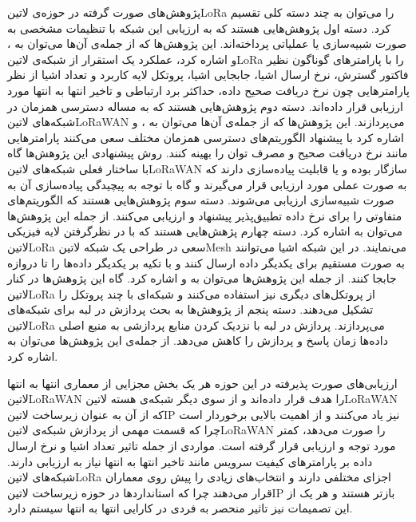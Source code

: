 پژوهش‌های صورت گرفته در حوزه‌ی ‌لاتین{LoRa} را می‌توان به چند دسته کلی تقسیم کرد. دسته اول پژوهش‌هایی هستند که به ارزیابی این شبکه با تنظیمات مشخصی
به صورت شبیه‌سازی یا عملیاتی پرداخته‌اند. این پژوهش‌ها که از جمله‌ی آن‌ها می‌توان به ،  و 
اشاره کرد، عملکرد یک استقرار از شبکه‌ی ‌لاتین{LoRa}
را با پارامترهای گوناگون نظیر فاکتور گسترش، نرخ ارسال اشیا، جابجایی اشیا، پروتکل لایه کاربرد و تعداد اشیا
از نظر پارامترهایی چون نرخ دریافت صحیح داده، حداکثر برد ارتباطی و تاخیر انتها به انتها
مورد ارزیابی قرار داده‌اند.
دسته دوم پژوهش‌هایی هستند که به مساله دسترسی همزمان در شبکه‌های ‌لاتین{LoRaWAN} می‌پردازند. این پژوهش‌ها که از جمله‌ی آن‌ها می‌توان به ،  و 
اشاره کرد با پیشنهاد الگوریتم‌های دسترسی همزمان مختلف سعی می‌کنند پارامترهایی مانند نرخ دریافت صحیح و مصرف توان را بهینه کنند. روش پیشنهادی این پژوهش‌ها گاه با ساختار فعلی
شبکه‌های ‌لاتین{LoRaWAN} سازگار بوده و یا قابلیت پیاده‌سازی دارند که به صورت عملی مورد ارزیابی قرار می‌گیرند و گاه با توجه به پیچیدگی پیاده‌سازی آن به صورت شبیه‌سازی ارزیابی می‌شوند.
دسته سوم پژوهش‌هایی هستند که الگوریتم‌های متفاوتی را برای نرخ داده تطبیق‌پذیر پیشنهاد و ارزیابی می‌کنند. از جمله این پژوهش‌ها می‌توان به  اشاره کرد.
دسته چهارم پژهش‌هایی هستند که با در نظرگرفتن لایه فیزیکی ‌لاتین{LoRa} سعی در طراحی یک شبکه ‌لاتین{Mesh} می‌نمایند. در این شبکه اشیا می‌توانند
به صورت مستقیم برای یکدیگر داده ارسال کنند و با تکیه بر یکدیگر داده‌ها را تا دروازه جابجا کنند. از جمله این پژوهش‌ها می‌توان به  و 
اشاره کرد.
گاه این پژوهش‌ها در کنار ‌لاتین{LoRa} از پروتکل‌های دیگری نیز استفاده می‌کنند و شبکه‌ای با چند پروتکل را تشکیل می‌دهند.
دسته پنجم از پژوهش‌ها به بحث پردازش در لبه برای شبکه‌های ‌لاتین{LoRa} می‌پردازند. پردازش در لبه با نزدیک کردن منابع پردازشی به منبع اصلی داده‌ها زمان پاسخ و پردازش را کاهش می‌دهد.
از جمله‌ی این پژوهش‌ها می‌توان به  اشاره کرد.

ارزیابی‌های صورت پذیرفته در این حوزه هر یک بخش مجزایی از معماری انتها به انتها ‌لاتین{LoRaWAN} را هدف قرار داده‌اند و از سوی دیگر شبکه‌ی هسته ‌لاتین{LoRaWAN}
که از آن به عنوان زیرساخت ‌لاتین{IP} نیز یاد می‌کنند
و از اهمیت بالایی برخوردار است چرا که قسمت مهمی از پردازش شبکه‌ی ‌لاتین{LoRaWAN} را صورت می‌دهد، کمتر مورد توجه و ارزیابی قرار گرفته است.
مواردی از جمله تاثیر تعداد اشیا و نرخ ارسال داده بر پارامترهای کیفیت سرویس مانند تاخیر انتها به انتها نیاز به ارزیابی دارند.
شبکه‌های ‌لاتین{LoRa} اجزای مختلفی دارند و انتخاب‌های زیادی را پیش روی معماران قرار می‌دهند
چرا که استانداردها در حوزه زیرساخت ‌لاتین{IP} بازتر هستند و
هر یک از این تصمیمات نیز
تاثیر منحصر به فردی در کارایی انتها به انتها سیستم دارد.

